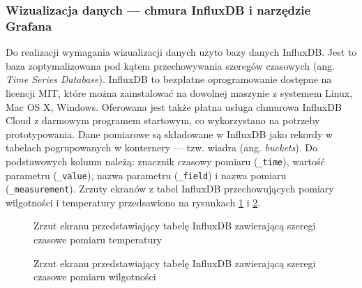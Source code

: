 \documentclass[a4paper, 12pt, twoside]{article}
\begin{document}
\subsubsection{Wizualizacja danych --- chmura InfluxDB i narzędzie Grafana}

Do realizacji wymagania wizualizacji danych użyto bazy danych InfluxDB.
Jest to baza zoptymalizowana pod kątem przechowywania szeregów czasowych 
(ang. \emph{Time Series Database}). InfluxDB to bezpłatne
oprogramowanie dostępne na licencji MIT, które można zainstalować na dowolnej
maszynie z systemem Linux, Mac OS X, Windows. Oferowana jest także 
płatna usługa chmurowa InfluxDB Cloud z darmowym programem startowym, co wykorzystano
na potrzeby prototypowania. Dane pomiarowe są składowane w InfluxDB
jako rekordy w tabelach pogrupowanych w konternery --- tzw. wiadra (ang. \emph{buckets}).
Do podstawowych kolumn należą: znacznik czasowy pomiaru (\texttt{\_time}), 
wartość parametru (\texttt{\_value}), nazwa parametru (\texttt{\_field}) i nazwa pomiaru (\texttt{\_measurement}).
Zrzuty ekranów z tabel InfluxDB przechowujących pomiary wilgotności i temperatury
przedsawiono na rysunkach \ref{fig:influx_1} i \ref{fig:influx_2}.

\begin{figure}[h]
      \centering
      \caption{Zrzut ekranu przedstawiający tabelę InfluxDB zawierającą szeregi czasowe pomiaru temperatury}
      \label{fig:influx_1}
\end{figure}

\begin{figure}[h]
      \centering
      \caption{Zrzut ekranu przedstawiający tabelę InfluxDB zawierającą szeregi czasowe pomiaru wilgotności}
      \label{fig:influx_2}
\end{figure}
\end{document}
